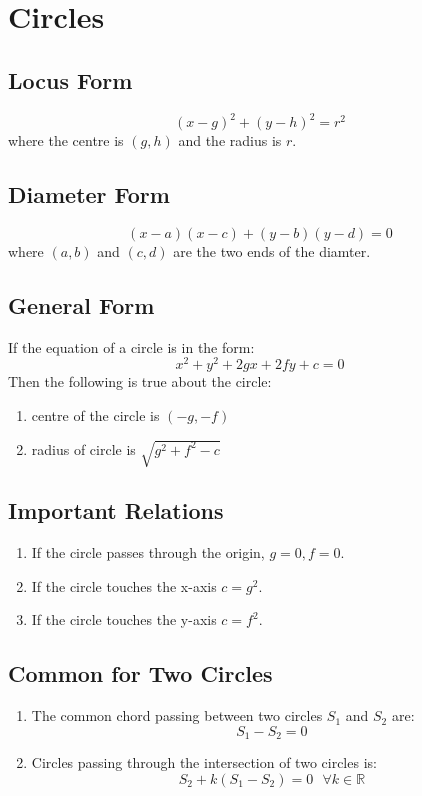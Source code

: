 \chapter{Circles}
\section{Locus Form}
\begin{equation}
	(x-g)^2+(y-h)^2=r^2
\end{equation}
where the centre is $(g,h)$ and the radius is $r$.


\section{Diameter Form}
\begin{equation}
	(x-a)(x-c)+(y-b)(y-d)=0
\end{equation}
where $(a,b)$ and $(c,d)$ are the two ends of the diamter.


\section{General Form}
If the equation of a circle is in the form:
\begin{equation}
	x^2+y^2+2gx+2fy+c=0
\end{equation}
Then the following is true about the circle:
\begin{enumerate}
	\item centre of the circle is $(-g,-f)$
	\item radius of circle is $\sqrt{g^2+f^2-c}$
\end{enumerate}


\section{Important Relations}
\begin{enumerate}
	\item If the circle passes through the origin, $g=0,f=0$.
	\item If the circle touches the x-axis $c=g^2$.
	\item If the circle touches the y-axis $c=f^2$.
\end{enumerate}


\section*{Common for Two Circles}
\begin{enumerate}
	\item The common chord passing between two circles $S_1$ and $S_2$ are:
	\begin{equation}
		S_1-S_2=0
	\end{equation}
	\item Circles passing through the intersection of two circles is:
	\begin{equation}
		S_2+k(S_1-S_2)=0\text{ }\forall k\in\mathbb{R}
	\end{equation}
\end{enumerate}
